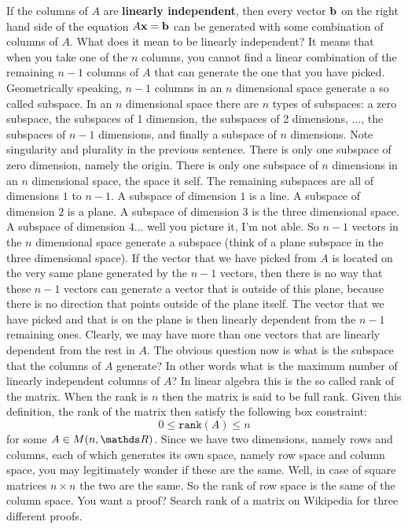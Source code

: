 \documentclass[computationalMathematics.tex]{subfiles}
\begin{document}
\par If the columns of $A$ are \textbf{linearly independent}, then every vector ${\bf b }$ on the right hand side of the equation $A {\bf x } = {\bf b }$ can be generated with some combination of columns of $A$. What does it mean to be linearly independent? It means that when you take one of the $n$ columns, you cannot find a linear combination of the remaining $n-1$ columns of $A$ that can generate the one that you have picked. Geometrically speaking, $n-1$ columns in an $n$ dimensional space generate a so called subspace. In an $n$ dimensional space there are $n$ types of subspaces: a zero subspace, the subspaces of 1 dimension, the subspaces of 2 dimensions, ..., the subspaces of $n-1$ dimensions, and finally a subspace of $n$ dimensions. Note singularity and plurality in the previous sentence. There is only one subspace of zero dimension, namely the origin. There is only one subspace of $n$ dimensions in an $n$ dimensional space, the space it self. The remaining subspaces are all of dimensions $1$ to $n-1$. A subspace of dimension $1$ is a line. A subspace of dimension $2$ is a plane. A subspace of dimension $3$ is the three dimensional space. A subspace of dimension $4$... well you picture it, I'm not able. So $n-1$ vectors in the $n$ dimensional space generate a subspace (think of a plane subspace in the three dimensional space). If the vector that we have picked from $A$ is located on the very same plane generated by the $n-1$ vectors, then there is no way that these $n-1$ vectors can generate a vector that is outside of this plane, because there is no direction that points outside of the plane itself. The vector that we have picked and that is on the plane is then linearly dependent from the $n-1$ remaining ones. Clearly, we may have more than one vectors that are linearly dependent from the rest in $A$. The obvious question now is what is the subspace that the columns of $A$ generate? In other words what is the maximum number of linearly independent columns of $A$? In linear algebra this is the so called rank of the matrix. When the rank is $n$ then the matrix is said to be full rank. Given this definition, the rank of the matrix then satisfy the following box constraint:
\[
    0 \leq \texttt{rank}(A) \leq n
\]
for some $A \in M(n,\R)$. Since we have two dimensions, namely rows and columns, each of which generates its own space, namely row space and column space, you may legitimately wonder if these are the same. Well, in case of square matrices $n \times n$ the two are the same. So the rank of row space is the same of the column space. You want a proof? Search rank of a matrix on Wikipedia for three different proofs.
\end{document}
